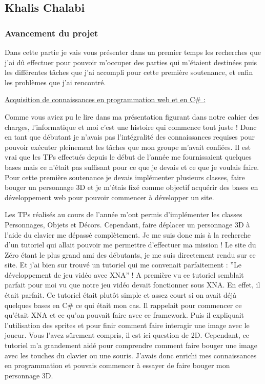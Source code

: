 \documentclass{article}
\begin{document}
\subsection{Khalis Chalabi}

\subsubsection{Avancement du projet}

Dans cette partie je vais vous présenter dans un premier temps les recherches que j’ai dû effectuer pour pouvoir m’occuper des parties qui m’étaient destinées puis les différentes tâches que j’ai accompli pour cette première soutenance, et enfin les problèmes que j’ai rencontré.
\newline

\par
\underline{Acquisition de connaissances en programmation web et en C\# :}
\newline

\par
Comme vous aviez pu le lire dans ma présentation figurant dans notre cahier des charges, l’informatique et moi c’est une histoire qui commence tout juste ! Donc en tant que débutant je n’avais pas l'intégralité des connaissances requises pour pouvoir exécuter pleinement les tâches que mon groupe m’avait confiées. Il est vrai que les TPs effectués depuis le début de l’année me fournissaient quelques bases mais ce n’était pas suffisant pour ce que je devais et ce que je voulais faire. Pour cette première soutenance je devais implémenter plusieurs classes, faire bouger un personnage 3D et je m’étais fixé comme objectif acquérir des bases en développement web pour pouvoir commencer à développer un site.
\newline

\par
Les TPs réalisés au cours de l’année m’ont permis d’implémenter les classes Personnages, Objets et Décors. Cependant, faire déplacer un personnage 3D à l’aide du clavier me dépassé complètement. Je me suis donc mis à la recherche d’un tutoriel qui allait pouvoir me permettre d’effectuer ma mission ! Le site du Zéro étant le plus grand ami des débutants, je me suis directement rendu sur ce site. Et j’ai bien sur trouvé un tutoriel qui me convenait parfaitement : ''Le développement de jeu vidéo avec XNA'' ! A première vu ce tutoriel semblait parfait pour moi vu que notre jeu vidéo devait fonctionner sous XNA. En effet, il était parfait. Ce tutoriel était plutôt simple et assez court si on avait déjà quelques bases en C\# ce qui était mon cas. Il rappelait pour commencer ce qu'était XNA et ce qu'on pouvait faire avec ce framework. Puis il expliquait l'utilisation des sprites et pour finir comment faire interagir une image avec le joueur. Vous l'avez sûrement compris, il est ici question de 2D. Cependant, ce tutoriel m'a grandement aidé pour comprendre comment faire bouger une image avec les touches du clavier ou une souris. J'avais donc enrichi mes connaissances en programmation et pouvais commencer à essayer de faire bouger mon personnage 3D.
\newline
\end{document}
